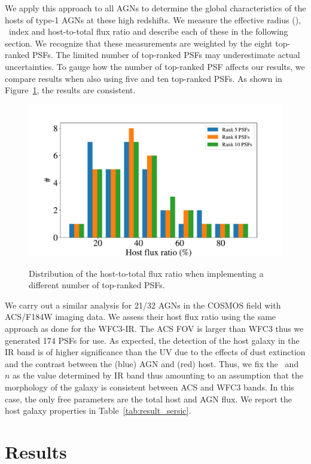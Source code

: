 \documentclass[apj]{emulateapj}
\begin{document}

We apply this approach to all AGNs to determine the global characteristics of the hosts of type-1 AGNs at these high redshifts. We measure the effective radius (\Reff), \sersic\ index and host-to-total flux ratio and describe each of these in the following section. We recognize that these measurements are weighted by the eight top-ranked PSFs. The limited number of top-ranked PSFs may underestimate actual uncertainties. To gauge how the number of top-ranked PSF affects our results, we compare results when also using five and ten top-ranked PSFs. As shown in Figure~\ref{fig:hist_compare}, the results are consistent.

\begin{figure}
\centering
{
\includegraphics[height=0.25\textwidth]{fig/hist_compare.pdf}
}
\caption{\label{fig:hist_compare} 
Distribution of the host-to-total flux ratio when implementing a different number of top-ranked PSFs.}
\end{figure} 


We carry out a similar analysis for 21/32 AGNs in the COSMOS field with ACS/F184W imaging data. We assess their host flux ratio using the same approach as done for the WFC3-IR. The ACS FOV is larger than WFC3 thus we generated 174 PSFs for use. As expected, the detection of the host galaxy in the IR band is of higher significance than the UV due to the effects of dust extinction and the contrast between the (blue) AGN and (red) host. Thus, we fix the \Reff\ and \sersic\ $n$ as the value determined by IR band thus amounting to an assumption that the morphology of the galaxy is consistent between ACS and WFC3 bands. In this case, the only free parameters are the total host and AGN flux. We report the host galaxy properties in Table~\ref{tab:result_sersic}.


\section{Results}
\label{sec:result}
\end{document}
